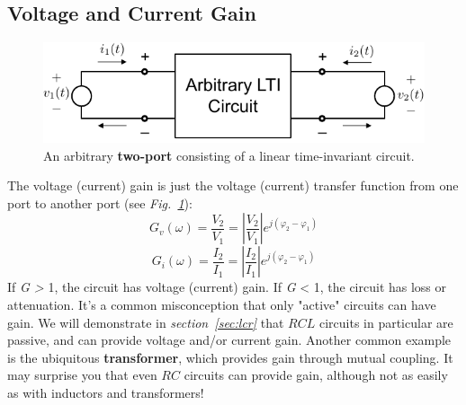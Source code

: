 \subsection{Voltage and Current Gain}
\begin{figure}[tb]
\centering
\includegraphics[width=.6\columnwidth]{mod1_3_1_twoport}
\caption{An arbitrary \textbf{two-port} consisting of a linear time-invariant circuit.}
\label{fig:twoportivgain}
\end{figure}
The voltage (current) gain is just the voltage (current) transfer function from one port to another port (see \emph{Fig.~\ref{fig:twoportivgain}}):
    \begin{equation}
        {G_v}(\omega ) = \frac{{{V_2}}}{{{V_1}}} = \left| {\frac{{{V_2}}}{{{V_1}}}} \right|{e^{j({\varphi _2} - {\varphi _1})}}
    \end{equation}
    \begin{equation}
        {G_i}(\omega ) = \frac{{{I_2}}}{{{I_1}}} = \left| {\frac{{{I_2}}}{{{I_1}}}} \right|{e^{j({\varphi _2} - {\varphi _1})}}
    \end{equation}
If \textit{G > }1, the circuit has voltage (current) gain.   If \textit{G} < 1, the circuit has loss or attenuation.   It's a common misconception that only "active" circuits can have gain.  We will demonstrate in \emph{section~\ref{sec:lcr}} that $RCL$ circuits in particular are passive, and can provide voltage and/or current gain.  Another common example is the ubiquitous \textbf{transformer}, which provides gain through mutual coupling.  It may surprise you that even $RC$ circuits can provide gain, although not as easily as with inductors and transformers!
